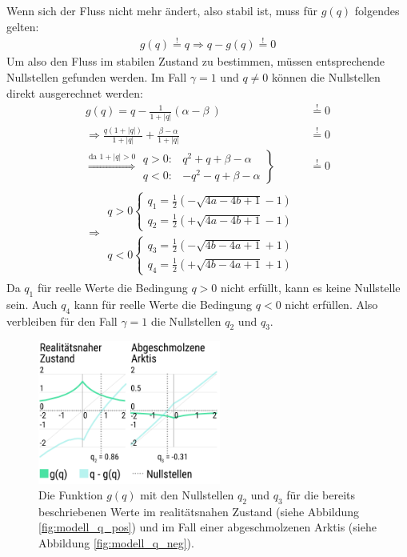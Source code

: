 \documentclass[a4paper,twoside]{article}
\begin{document}
	Wenn sich der Fluss nicht mehr ändert, also stabil ist, muss für \(g(q)\) folgendes gelten:
	\begin{align*}
		g(q) \stackrel{!}{=} q \Rightarrow q - g(q) \stackrel{!}{=} 0
	\end{align*}
	Um also den Fluss im stabilen Zustand zu bestimmen, müssen entsprechende Nullstellen gefunden werden. Im Fall \(\gamma = 1\) und \(q \neq 0\) können die Nullstellen direkt ausgerechnet werden:
	\begin{align*}
		g(q) = q - \frac{1}{1 + |q|}  \left(\alpha - \beta\ \right) &\stackrel{!}{=} 0 \\
		\Rightarrow \frac{q \left( 1 + |q| \right)}{1 + |q|} + \frac{\beta - \alpha}{1 + |q|}  &\stackrel{!}{=} 0 \\
		\stackrel{\textrm{da } 1 + |q| > 0}{\Rightarrow} \left. \begin{array}{ll}
			q > 0: & q^2 + q + \beta - \alpha \\
			q < 0: & -q^2 - q + \beta - \alpha
		\end{array} \right\} &\stackrel{!}{=} 0 \\
		\Rightarrow \begin{array}{l}
			q > 0 \left\{ \begin{array}{l}
				q_1 = \frac{1}{2}\left( -\sqrt{4a - 4b + 1} -1 \right)	\\			
				q_2 = \frac{1}{2}\left( +\sqrt{4a - 4b + 1} -1 \right)				
			\end{array}\right. \\
			q < 0 \left\{ \begin{array}{l}
				q_3 = \frac{1}{2}\left( -\sqrt{4b - 4a + 1} + 1 \right) \\
				q_4 = \frac{1}{2}\left( +\sqrt{4b - 4a + 1} + 1 \right)
			\end{array}\right.
		\end{array}
	\end{align*}
	Da \(q_1\) für reelle Werte die Bedingung \(q > 0\) nicht erfüllt, kann es keine Nullstelle sein. Auch \(q_4\) kann für reelle Werte die Bedingung \(q < 0\) nicht erfüllen. Also verbleiben für den Fall \(\gamma = 1\) die Nullstellen \(q_2\) und \(q_3\).
	
	\begin{figure}[!h]
  		\centering
 		\includegraphics[width=6cm]{Grafiken/g_von_q_gamma_1.png}
  		\caption{Die Funktion \(g(q)\) mit den Nullstellen \(q_2\) und \(q_3\) für die bereits beschriebenen Werte im realitätsnahen Zustand (siehe Abbildung \ref{fig:modell_q_pos}) und im Fall einer abgeschmolzenen Arktis (siehe Abbildung \ref{fig:modell_q_neg}).}
  		\label{fig:g_von_q_gamma_1}
	\end{figure}	
\end{document}
